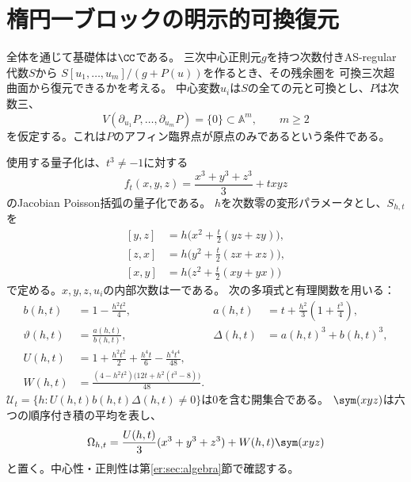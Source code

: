 \section{楕円一ブロックの明示的可換復元}\label{er:sec:intro}

全体を通じて基礎体は$\CC$である。
三次中心正則元$g$を持つ次数付きAS-regular代数$S$から
$S[u_1,\ldots,u_m]/(g+P(u))$を作るとき、その残余圏を
可換三次超曲面から復元できるかを考える。
中心変数$u_i$は$S$の全ての元と可換とし、$P$は次数三、
\begin{equation}\label{er:eq:isolated}
 V(\partial_{u_1}P,\ldots,\partial_{u_m}P)=\{0\}\subset\mathbb A^m,
 \qquad m\ge2
\end{equation}
を仮定する。これは$P$のアフィン臨界点が原点のみであるという条件である。

使用する量子化は、$t^3\ne-1$に対する
\[
 f_t(x,y,z)=\frac{x^3+y^3+z^3}{3}+txyz
\]
のJacobian Poisson括弧の量子化である。
$h$を次数零の変形パラメータとし、$S_{h,t}$を
\begin{equation}\label{er:eq:relations}
\begin{aligned}
 [y,z]&=h\bigl(x^2+\tfrac t2(yz+zy)\bigr),\\
 [z,x]&=h\bigl(y^2+\tfrac t2(zx+xz)\bigr),\\
 [x,y]&=h\bigl(z^2+\tfrac t2(xy+yx)\bigr)
\end{aligned}
\end{equation}
で定める。$x,y,z,u_i$の内部次数は一である。
次の多項式と有理関数を用いる：
\begin{equation}\label{er:eq:coefficients}
\begin{aligned}
 b(h,t)&=1-\frac{h^2t^2}{4},&
 a(h,t)&=t+\frac{h^2}{3}\left(1+\frac{t^3}{4}\right),\\
 \vartheta(h,t)&=\frac{a(h,t)}{b(h,t)},&
 \Delta(h,t)&=a(h,t)^3+b(h,t)^3,\\
 U(h,t)&=1+\frac{h^2t^2}{2}+\frac{h^4t}{6}-\frac{h^4t^4}{48},\\
 W(h,t)&=\frac{(4-h^2t^2)\bigl(12t+h^2(t^3-8)\bigr)}{48}.
\end{aligned}
\end{equation}
$\mathscr U_t=\{h:U(h,t)b(h,t)\Delta(h,t)\ne0\}$は$0$を含む開集合である。
$\sym(xyz)$は六つの順序付き積の平均を表し、
\begin{equation}\label{er:eq:center}
 \Omega_{h,t}=\frac{U(h,t)}3(x^3+y^3+z^3)+W(h,t)\sym(xyz)
\end{equation}
と置く。中心性・正則性は第\ref{er:sec:algebra}節で確認する。

